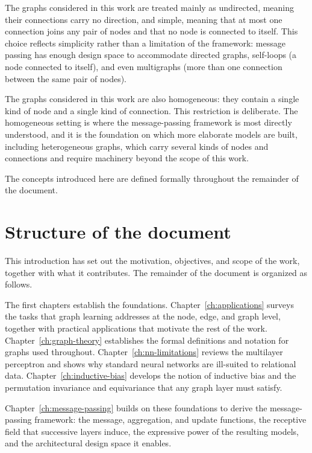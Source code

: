 The graphs considered in this work are treated mainly as
undirected, meaning their connections carry no direction, and
simple, meaning that at most one connection joins any pair of nodes and
that no node is connected to itself. This choice reflects simplicity rather than a limitation 
of the framework: message passing has enough design space to accommodate directed graphs,
self-loops (a node connected to itself), and even
multigraphs (more than one connection between the same pair of nodes).

The graphs considered in this work are also homogeneous: they contain a single kind of node
and a single kind of connection. This restriction is deliberate. The
homogeneous setting is where the message-passing framework is most directly
understood, and it is the foundation on which more elaborate models are built,
including heterogeneous graphs, which carry several kinds of nodes and
connections and require machinery beyond the scope of this work.

The concepts introduced here are defined formally throughout the remainder of the document.

\section{Structure of the document}
\label{sec:document-structure}

This introduction has set out the motivation, objectives, and scope of the
work, together with what it contributes.
The remainder of the document is organized as follows.

The first chapters establish the foundations. Chapter~\ref{ch:applications}
surveys the tasks that graph learning addresses at the node, edge, and graph
level, together with practical applications that motivate the rest of the work.
Chapter~\ref{ch:graph-theory} establishes the formal definitions and notation
for graphs used throughout. Chapter~\ref{ch:nn-limitations} reviews the
multilayer perceptron and shows why standard neural networks are ill-suited to
relational data. Chapter~\ref{ch:inductive-bias} develops the notion of
inductive bias and the permutation invariance and equivariance that any graph
layer must satisfy.

Chapter~\ref{ch:message-passing} builds on these foundations to derive the
message-passing framework: the message, aggregation, and update functions, the
receptive field that successive layers induce, the expressive power of the
resulting models, and the architectural design space it enables.


